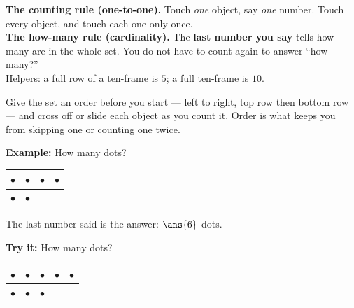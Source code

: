 \documentclass[12pt]{article}
\begin{document}

\begin{formulabox}
\textbf{The counting rule (one-to-one).} Touch \emph{one} object, say
\emph{one} number. Touch every object, and touch each one only once.\\[3pt]
\textbf{The how-many rule (cardinality).} The \textbf{last number you say} tells
how many are in the whole set. You do not have to count again to answer ``how
many?''\\[3pt]
Helpers: a full row of a ten-frame is $5$; a full ten-frame is $10$.
\end{formulabox}


\begin{formulabox}
Give the set an order before you start --- left to right, top row then bottom
row --- and cross off or slide each object as you count it. Order is what keeps
you from skipping one or counting one twice.
\end{formulabox}

\begin{examplebox}
\textbf{Example:} How many dots?\quad
\begin{tabular}{|c|c|c|c|}\hline
$\bullet$ & $\bullet$ & $\bullet$ & $\bullet$ \\[0.2cm]\hline
$\bullet$ & $\bullet$ & & \\[0.2cm]\hline
\end{tabular}
The last number said is the answer: $\ans{6}$ dots.
\end{examplebox}

\begin{tryitbox}
\textbf{Try it:} How many dots?\quad
\begin{tabular}{|c|c|c|c|c|}\hline
$\bullet$ & $\bullet$ & $\bullet$ & $\bullet$ & $\bullet$ \\[0.2cm]\hline
$\bullet$ & $\bullet$ & $\bullet$ & & \\[0.2cm]\hline
\end{tabular}\\[2pt]
\end{tryitbox}

\end{document}
